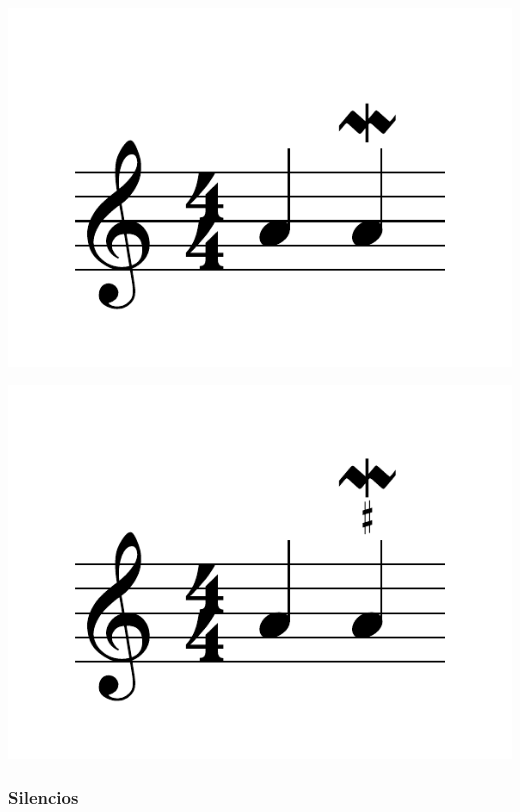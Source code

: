 \documentclass{article}
\begin{document}
\includegraphics[scale=0.5]{figures_tests/pdf/skern/ornaments5.pdf}

\includegraphics[scale=0.5]{figures_tests/pdf/skern/ornaments6.pdf}

\subsubsection{Silencios}
\end{document}
